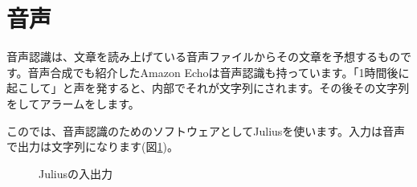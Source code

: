 \section{音声}
音声認識は、文章を読み上げている音声ファイルからその文章を予想するものです。音声合成でも紹介したAmazon Echoは音声認識も持っています。「1時間後に起こして」と声を発すると、内部でそれが文字列にされます。その後その文字列をしてアラームをします。

このでは、音声認識のためのソフトウェアとしてJuliusを使います。入力は音声で出力は文字列になります(図\ref{Juliusの入出力})。

\begin{figure}[H]
\begin{center}
    
    \caption{Juliusの入出力}
    \label{Juliusの入出力}
\end{center}
\end{figure}

\begin{tcolorbox}[title=\useOmetoi]
\begin{enumerate}
\end{enumerate}
\end{tcolorbox}
